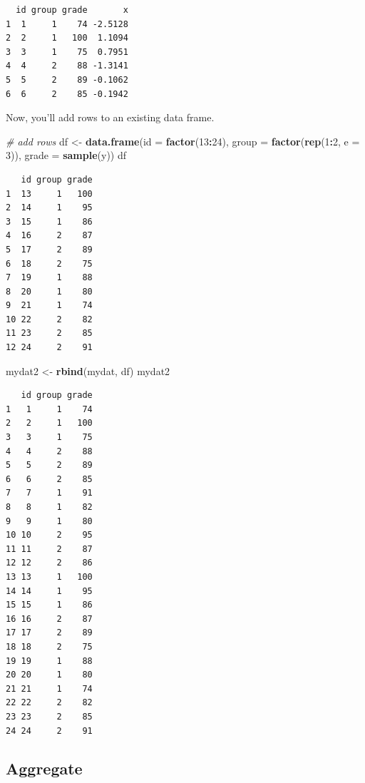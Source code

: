 \documentclass[
]{book}
\newenvironment{Shaded}{\begin{snugshade}}{\end{snugshade}}
\newcommand{\CommentTok}[1]{\textcolor[rgb]{0.56,0.35,0.01}{\textit{#1}}}
\newcommand{\DataTypeTok}[1]{\textcolor[rgb]{0.13,0.29,0.53}{#1}}
\newcommand{\DecValTok}[1]{\textcolor[rgb]{0.00,0.00,0.81}{#1}}
\newcommand{\KeywordTok}[1]{\textcolor[rgb]{0.13,0.29,0.53}{\textbf{#1}}}
\newcommand{\NormalTok}[1]{#1}
\newcommand{\OperatorTok}[1]{\textcolor[rgb]{0.81,0.36,0.00}{\textbf{#1}}}
\newcommand{\StringTok}[1]{\textcolor[rgb]{0.31,0.60,0.02}{#1}}
\begin{document}
\begin{verbatim}
  id group grade       x
1  1     1    74 -2.5128
2  2     1   100  1.1094
3  3     1    75  0.7951
4  4     2    88 -1.3141
5  5     2    89 -0.1062
6  6     2    85 -0.1942
\end{verbatim}

Now, you'll add rows to an existing data frame.

\begin{Shaded}
\begin{Highlighting}[]
\CommentTok{# add rows}
\NormalTok{df <-}\StringTok{ }\KeywordTok{data.frame}\NormalTok{(}\DataTypeTok{id =} \KeywordTok{factor}\NormalTok{(}\DecValTok{13}\OperatorTok{:}\DecValTok{24}\NormalTok{), }
                 \DataTypeTok{group =} \KeywordTok{factor}\NormalTok{(}\KeywordTok{rep}\NormalTok{(}\DecValTok{1}\OperatorTok{:}\DecValTok{2}\NormalTok{, }\DataTypeTok{e =} \DecValTok{3}\NormalTok{)), }\DataTypeTok{grade =} \KeywordTok{sample}\NormalTok{(y))}
\NormalTok{df}
\end{Highlighting}
\end{Shaded}

\begin{verbatim}
   id group grade
1  13     1   100
2  14     1    95
3  15     1    86
4  16     2    87
5  17     2    89
6  18     2    75
7  19     1    88
8  20     1    80
9  21     1    74
10 22     2    82
11 23     2    85
12 24     2    91
\end{verbatim}

\begin{Shaded}
\begin{Highlighting}[]
\NormalTok{mydat2 <-}\StringTok{ }\KeywordTok{rbind}\NormalTok{(mydat, df)}
\NormalTok{mydat2}
\end{Highlighting}
\end{Shaded}

\begin{verbatim}
   id group grade
1   1     1    74
2   2     1   100
3   3     1    75
4   4     2    88
5   5     2    89
6   6     2    85
7   7     1    91
8   8     1    82
9   9     1    80
10 10     2    95
11 11     2    87
12 12     2    86
13 13     1   100
14 14     1    95
15 15     1    86
16 16     2    87
17 17     2    89
18 18     2    75
19 19     1    88
20 20     1    80
21 21     1    74
22 22     2    82
23 23     2    85
24 24     2    91
\end{verbatim}

\hypertarget{aggregate}{%
\subsection{Aggregate}\label{aggregate}}
\end{document}
